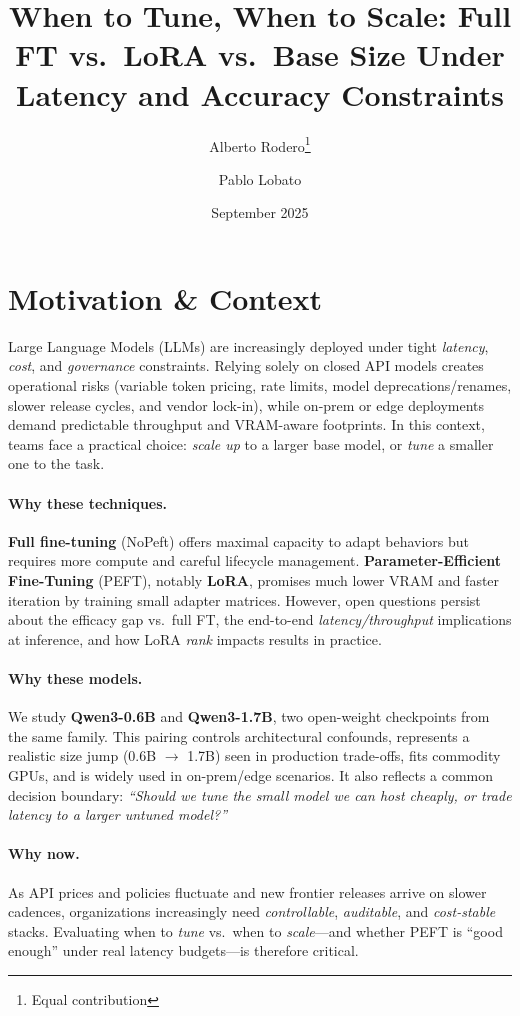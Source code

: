 \documentclass[11pt,a4paper]{article}
\title{When to Tune, When to Scale: Full FT vs.\ LoRA vs.\ Base Size Under Latency and Accuracy Constraints}
\author{Alberto Rodero\thanks{Equal contribution} \and Pablo Lobato\footnotemark[1]}
\date{September 2025}
\begin{document}
\maketitle

\section{Motivation \& Context}
Large Language Models (LLMs) are increasingly deployed under tight \textit{latency}, \textit{cost}, and \textit{governance} constraints. Relying solely on closed API models creates operational risks (variable token pricing, rate limits, model deprecations/renames, slower release cycles, and vendor lock-in), while on-prem or edge deployments demand predictable throughput and VRAM-aware footprints. In this context, teams face a practical choice: \emph{scale up} to a larger base model, or \emph{tune} a smaller one to the task.

\paragraph{Why these techniques.}
\textbf{Full fine-tuning} (NoPeft) offers maximal capacity to adapt behaviors but requires more compute and careful lifecycle management. \textbf{Parameter-Efficient Fine-Tuning} (PEFT), notably \textbf{LoRA}\cite{lora}, promises much lower VRAM and faster iteration by training small adapter matrices. However, open questions persist about the efficacy gap vs.\ full FT, the end-to-end \emph{latency/throughput} implications at inference, and how LoRA \emph{rank} impacts results in practice.

\paragraph{Why these models.}
We study \textbf{Qwen3-0.6B} and \textbf{Qwen3-1.7B}, two open-weight checkpoints from the same family. This pairing controls architectural confounds, represents a realistic size jump (0.6B $\rightarrow$ 1.7B) seen in production trade-offs, fits commodity GPUs, and is widely used in on-prem/edge scenarios. It also reflects a common decision boundary: \emph{``Should we tune the small model we can host cheaply, or trade latency to a larger untuned model?''}

\paragraph{Why now.}
As API prices and policies fluctuate and new frontier releases arrive on slower cadences, organizations increasingly need \textit{controllable}, \textit{auditable}, and \textit{cost-stable} stacks. Evaluating when to \emph{tune} vs.\ when to \emph{scale}---and whether PEFT is ``good enough'' under real latency budgets---is therefore critical.
\end{document}
